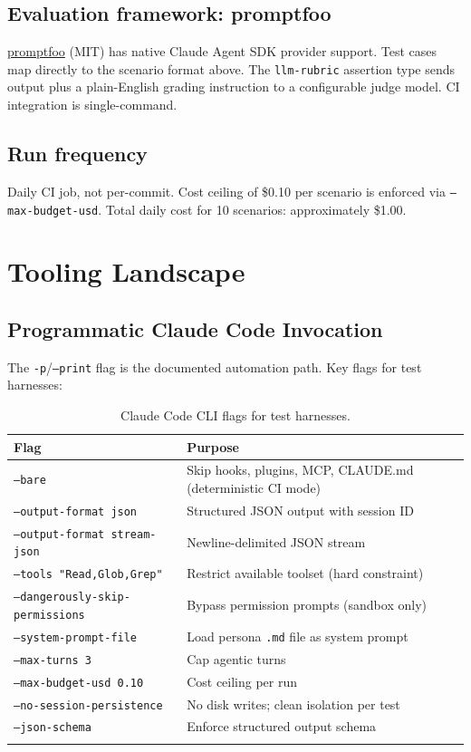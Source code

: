 \documentclass[a4paper,10pt]{article}
\newcommand{\cmd}[1]{\texttt{#1}}
\begin{document}
\subsection*{Evaluation framework: promptfoo}

\href{https://github.com/promptfoo/promptfoo}{promptfoo} (MIT) has
native Claude Agent SDK provider support.  Test cases map directly
to the scenario format above.  The \texttt{llm-rubric} assertion type
sends output plus a plain-English grading instruction to a configurable
judge model.  CI integration is single-command.

\subsection*{Run frequency}

Daily CI job, not per-commit.  Cost ceiling of \$0.10 per scenario
is enforced via \cmd{--max-budget-usd}.  Total daily cost for 10
scenarios: approximately \$1.00.

\section{Tooling Landscape}

\subsection{Programmatic Claude Code Invocation}

The \texttt{-p}/\texttt{--print} flag is the documented automation
path.  Key flags for test harnesses:

\begin{longtable}{ll}
\toprule
\textbf{Flag} & \textbf{Purpose} \\
\midrule
\endhead
\cmd{--bare}                   & Skip hooks, plugins, MCP, CLAUDE.md (deterministic CI mode) \\
\cmd{--output-format json}     & Structured JSON output with session ID \\
\cmd{--output-format stream-json} & Newline-delimited JSON stream \\
\cmd{--tools "Read,Glob,Grep"} & Restrict available toolset (hard constraint) \\
\cmd{--dangerously-skip-permissions} & Bypass permission prompts (sandbox only) \\
\cmd{--system-prompt-file}     & Load persona \texttt{.md} file as system prompt \\
\cmd{--max-turns 3}            & Cap agentic turns \\
\cmd{--max-budget-usd 0.10}    & Cost ceiling per run \\
\cmd{--no-session-persistence} & No disk writes; clean isolation per test \\
\cmd{--json-schema}            & Enforce structured output schema \\
\bottomrule
\caption{Claude Code CLI flags for test harnesses.}
\end{longtable}
\end{document}
